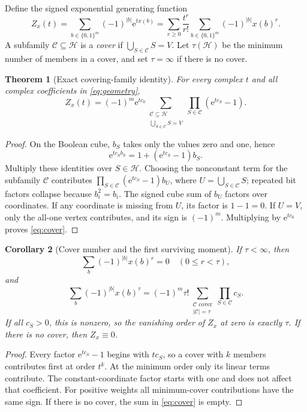 \documentclass[11pt,oneside]{article}
\numberwithin{equation}{section}
\newtheorem{theorem}{Theorem}[section]
\newtheorem{corollary}[theorem]{Corollary}
\theoremstyle{definition}
\theoremstyle{remark}
\newcommand{\HH}{\mathcal H}
\newcommand{\CCov}{\mathcal C}
\newcommand{\e}{\mathrm e}
\newcommand{\bits}{\{0,1\}}
\begin{document}
Define the signed exponential generating function
\begin{equation}
 Z_x(t)=\sum_{b\in\bits^m}(-1)^{|b|}\e^{t x(b)}
       =\sum_{r\ge0}\frac{t^r}{r!}
           \sum_{b\in\bits^m}(-1)^{|b|}x(b)^r.
 \label{eq:Z}
\end{equation}
A subfamily \(\CCov\subseteq\HH\) is a \emph{cover} if
\(\bigcup_{S\in\CCov}S=V\). Let \(\tau(\HH)\) be the minimum number of
members in a cover, and set \(\tau=\infty\) if there is no cover.

\begin{theorem}[Exact covering-family identity]
\label{thm:cover}
For every complex \(t\) and all complex coefficients in \eqref{eq:geometry},
\begin{equation}
 Z_x(t)=(-1)^m\e^{tc_0}
 \sum_{\substack{\CCov\subseteq\HH\\\bigcup_{S\in\CCov}S=V}}
       \prod_{S\in\CCov}(\e^{tc_S}-1).
 \label{eq:cover}
\end{equation}
\end{theorem}
\begin{proof}
On the Boolean cube, \(b_S\) takes only the values zero and one, hence
\[
 \e^{tc_Sb_S}=1+(\e^{tc_S}-1)b_S.
\]
Multiply these identities over \(S\in\HH\). Choosing the nonconstant term
for the subfamily \(\CCov\) contributes
\(\prod_{S\in\CCov}(\e^{tc_S}-1)b_U\), where
\(U=\bigcup_{S\in\CCov}S\); repeated bit factors collapse because
\(b_i^2=b_i\). The signed cube sum of \(b_U\) factors over coordinates. If
any coordinate is missing from \(U\), its factor is \(1-1=0\). If \(U=V\),
only the all-one vertex contributes, and its sign is \((-1)^m\).
Multiplying by \(\e^{tc_0}\) proves \eqref{eq:cover}.
\end{proof}

\begin{corollary}[Cover number and the first surviving moment]
\label{cor:coverorder}
If \(\tau<\infty\), then
\begin{equation}
 \sum_b(-1)^{|b|}x(b)^r=0\quad(0\le r<\tau),
 \label{eq:covervanish}
\end{equation}
and
\begin{equation}
 \sum_b(-1)^{|b|}x(b)^\tau
 =(-1)^m\tau!
  \sum_{\substack{\CCov\text{ cover}\\|\CCov|=\tau}}
       \prod_{S\in\CCov}c_S.
 \label{eq:coverlead}
\end{equation}
If all \(c_S>0\), this is nonzero, so the vanishing order of \(Z_x\) at zero
is exactly \(\tau\). If there is no cover, then \(Z_x\equiv0\).
\end{corollary}
\begin{proof}
Every factor \(\e^{tc_S}-1\) begins with \(tc_S\), so a cover with \(k\)
members contributes first at order \(t^k\). At the minimum order only its
linear terms contribute. The constant-coordinate factor starts with one and
does not affect that coefficient. For positive weights all minimum-cover
contributions have the same sign. If there is no cover, the sum in
\eqref{eq:cover} is empty.
\end{proof}
\end{document}

